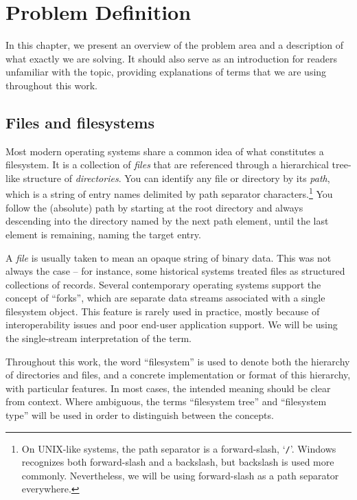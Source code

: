 
\chapter{Problem Definition}

In this chapter, we present an overview of the problem area and a description of what exactly we are solving.
It should also serve as an introduction for readers unfamiliar with the topic, providing explanations of terms
that we are using throughout this work.


\section{Files and filesystems}

Most modern operating systems share a common idea of what constitutes a filesystem. It is a collection of {\it
files} that are referenced through a hierarchical tree-like structure of {\it directories}.  You can identify
any file or directory by its {\it path}, which is a string of entry names delimited by path separator
characters.\footnote{On UNIX-like systems, the path separator is a forward-slash, `{\tt /}'.  Windows
recognizes both forward-slash and a backslash, but backslash is used more commonly.  Nevertheless, we will be
using forward-slash as a path separator everywhere.} You follow the (absolute) path by starting at the root
directory and always descending into the directory named by the next path element, until the last element is
remaining, naming the target entry.

A {\it file} is usually taken to mean an opaque string of binary data. This was not always the case -- for
instance, some historical systems treated files as structured collections of records. Several contemporary
operating systems support the concept of ``forks'', which are separate data streams associated with a single
filesystem object. This feature is rarely used in practice, mostly because of interoperability issues and poor
end-user application support. We will be using the single-stream interpretation of the term.

Throughout this work, the word ``filesystem'' is used to denote both the hierarchy of directories and files,
and a concrete implementation or format of this hierarchy, with particular features.  In most cases, the
intended meaning should be clear from context. Where ambiguous, the terms ``filesystem tree'' and ``filesystem
type'' will be used in order to distinguish between the concepts.

